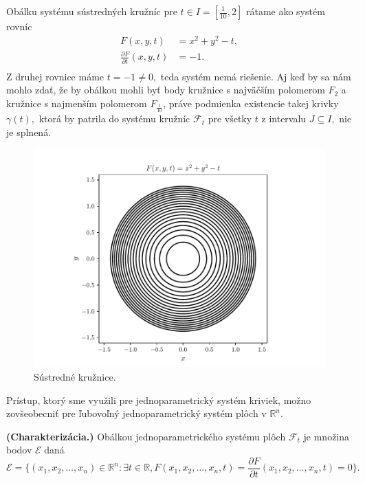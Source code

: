 \begin{example} 
Obálku systému sústredných kružníc pre $t \in I=[\frac{1}{10},2]$ rátame ako systém rovníc
\begin{align*}
F(x, y, t) &= x^2 + y^2 - t, \\
\frac{\partial F}{\partial t}(x,y,t) &= -1. \\
\end{align*}
Z druhej rovnice máme $t=-1 \neq 0,$ teda systém nemá riešenie. Aj keď by sa nám mohlo zdať, že by obálkou mohli byť body kružnice s najväčším polomerom $F_2$ a kružnice s najmenším polomerom $F_{\frac{1}{10}}$, práve podmienka existencie takej krivky $\gamma(t),$ ktorá by patrila do systému kružníc $\mathcal{F}_t$ pre všetky $t$ z intervalu $J \subseteq  I, $ nie je splnená.
\end{example}

\begin{figure}[H]
	\centering
	\includegraphics{images/concentric_circles.pdf}
	\caption{Sústredné kružnice.}
	\label{fig:concentric_circles}
\end{figure}


Prístup, ktorý sme využili pre jednoparametrický systém kriviek, možno zovšeobecniť pre ľubovoľný jednoparametrický systém plôch v $\mathbb{R}^n.$

\begin{definition}{\textbf{\textup{(Charakterizácia.)}}}
Obálkou jednoparametrického systému plôch $ \mathcal{F}_{t} $ je množina bodov $\mathcal{E}$ daná
$$\mathcal{E} = \{(x_{1}, x_{2}, \dots, x_{n})  \in \mathbb{R}^{n} \colon \exists t \in \mathbb{R}, F(x_{1}, x_{2}, \dots, x_{n}, t) = \frac{\partial F}{\partial t}(x_{1}, x_{2}, \dots, x_{n}, t) = 0 \}.$$
\end{definition}

